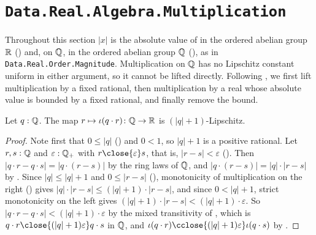 \section{\texttt{Data.Real.Algebra.Multiplication}}

Throughout this section $\lvert x \rvert$ is the absolute value of  in the ordered abelian group $\mathbb{R}$ () and, on $\mathbb{Q}$, in the ordered abelian group $\mathbb{Q}$ (), as in \texttt{Data.Real.Order.Magnitude}. Multiplication on $\mathbb{Q}$ has no Lipschitz constant uniform in either argument, so it cannot be lifted directly. Following \textcite[\S~4.3]{gilbert2017}, we first lift multiplication by a fixed rational, then multiplication by a real whose absolute value is bounded by a fixed rational, and finally remove the bound.

\begin{lemma}
  \label{scaleRatIsLipschitzWith}
  Let $q : \mathbb{Q}$. The map $r \mapsto \iota(q \cdot r) \colon \mathbb{Q} \to \mathbb{R}$ is $(\lvert q \rvert + 1)$-Lipschitz.
\end{lemma}
\begin{proof}
  Note first that $0 \le \lvert q \rvert$ () and $0 < 1$, so $\lvert q \rvert + 1$ is a positive rational. Let $r, s : \mathbb{Q}$ and $\varepsilon : \mathbb{Q}_{+}$ with $r \close{\varepsilon} s$, that is, $\lvert r - s \rvert < \varepsilon$ (). Then $\lvert q \cdot r - q \cdot s \rvert = \lvert q \cdot (r - s) \rvert$ by the ring laws of $\mathbb{Q}$, and $\lvert q \cdot (r - s) \rvert = \lvert q \rvert \cdot \lvert r - s \rvert$ by . Since $\lvert q \rvert \le \lvert q \rvert + 1$ and $0 \le \lvert r - s \rvert$ (), monotonicity of multiplication on the right () gives $\lvert q \rvert \cdot \lvert r - s \rvert \le (\lvert q \rvert + 1) \cdot \lvert r - s \rvert$, and since $0 < \lvert q \rvert + 1$, strict monotonicity on the left gives $(\lvert q \rvert + 1) \cdot \lvert r - s \rvert < (\lvert q \rvert + 1) \cdot \varepsilon$. So $\lvert q \cdot r - q \cdot s \rvert < (\lvert q \rvert + 1) \cdot \varepsilon$ by the mixed transitivity of , which is $q \cdot r \close{(\lvert q \rvert + 1)\varepsilon} q \cdot s$ in $\mathbb{Q}$, and $\iota(q \cdot r) \cclose{(\lvert q \rvert + 1)\varepsilon} \iota(q \cdot s)$ by .
\end{proof}


